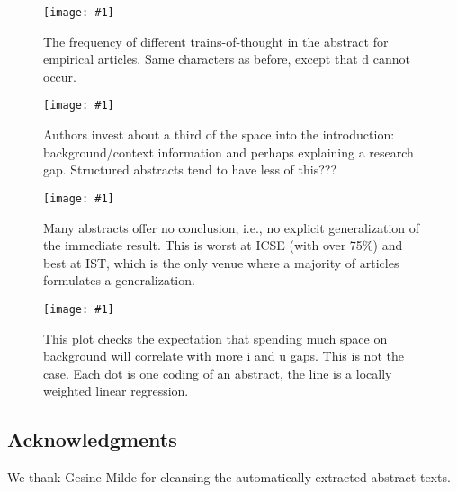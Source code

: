 \documentclass[10pt,journal,compsoc]{IEEEtran}
\newcommand{\Plot}[2]{%
	\begin{figure}[!t]%
		\centering\texttt{[image: \#1]}%
		\vspace{-4mm}\caption{#2}\label{#1}%
	\end{figure}}
\begin{document}
\Plot{ab_topicstructure_freqs_empir}{%
	The frequency of different trains-of-thought in the abstract for empirical articles.
	Same characters as before, except that d cannot occur.}
\Plot{boxplots_fraction_introduction}{%
	Authors invest about a third of the space into the introduction:
	background/context information and perhaps explaining a research gap.
	Structured abstracts tend to have less of this???}
\Plot{boxplots_fraction_conclusion}{%
	Many abstracts offer no conclusion, i.e., no explicit generalization of the immediate result.
	This is worst at ICSE (with over 75\%)
	and best at IST, which is the only venue where a majority of articles formulates a generalization.}
\Plot{lowess_gaps_by_fracintro}{%
	This plot checks the expectation that spending much space on background
	will correlate with more i and u gaps.
	This is not the case.
	Each dot is one coding of an abstract, 
	the line is a locally weighted linear regression.}



\subsection{Acknowledgments}
\noindent We thank Gesine Milde for cleansing the automatically extracted abstract texts.




\end{document}

